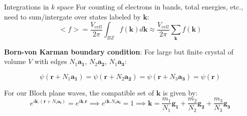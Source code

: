 \documentclass[aspectratio=169]{beamer}
\let \vec \mathbf
\begin{document}
    \begin{frame}{Integrations in $k$ space}
        For counting of electrons in bands, total energies, etc., need to sum/intergate over states labeled by $\vec{k}$:
        \begin{equation*}
            <f> = \frac{V_{cell}}{2\pi} \int_{BZ} f(\vec{k}) d\vec{k} \approx \frac{V_{cell}}{2\pi} \sum_{\vec{k}} f(\vec{k})
        \end{equation*}

        \textbf{Born-von Karman boundary condition}: For large but finite crystal of volume $V$ with edges $N_1 \vec{a_1}$, $N_2 \vec{a_2}$, $N_1 \vec{a_3}$:

        \begin{equation*}
            \psi(\vec{r} + N_1 \vec{a_1}) = \psi(\vec{r} + N_2 \vec{a_2}) = \psi(\vec{r} + N_3 \vec{a_3}) = \psi(\vec{r})
        \end{equation*}

        For our Bloch plane waves, the compatible set of $\vec{k}$ is given by:
        \begin{equation*}
            e^{i\vec{k}.(\vec{r} + N_i \vec{a_i})} = e^{i\vec{k}.\vec{r}}\implies e^{i\vec{k}.N_i \vec{a_i}} = 1 \implies \vec{k} = \frac{m_1}{N_1} \vec{g_1} +  \frac{m_2}{N_2} \vec{g_2} +\frac{m_3}{N_3} \vec{g_3}
        \end{equation*}

    \end{frame}
\end{document}

